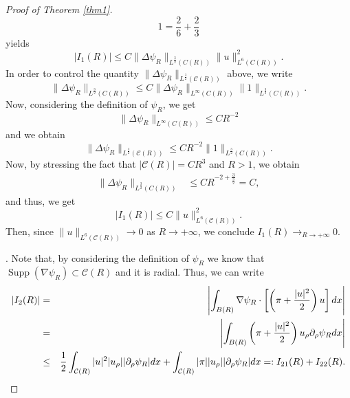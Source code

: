 \documentclass[a4paper,12pt]{amsart}
\theoremstyle{definition}
\theoremstyle{plain}
\def\vu{ u }
\def\vn{ \nabla }
\def\supp{\operatorname{Supp}}
\begin{document}
\begin{proof}[Proof of Theorem \ref{thm1}]
\begin{equation}\label{variable_exponents_1}
1=\frac{2}{6}+\frac{2}{3}
\end{equation} yields  
\begin{equation}\label{202618aveq32_T1}
|I_1(R)|\leq C
\|\Delta\psi_R\|_{L^{\frac 3 2}(C( R) )}
\|\vu\|_{L^{6}( C( R)  )}^2.
\end{equation}
 In order to control the quantity $\|\Delta \psi_R \|_{L^{  \frac 3 2 }(\mathcal{C}( R) )}$ above,
we write
\begin{equation}\label{EstimationNormeLinfiniTheta_R1}
\|\Delta \psi_R \|_{L^{ \frac 3 2 }(C( R) )}
\leq 
C\|\Delta \psi_R  \|_{L^{\infty}  (C (R) )
}\|1\|_{L^{\frac 3 2 }(C( R) )}.
\end{equation}
Now, considering  the definition of  $\psi_R$,  we get 
$$
\|\Delta \psi_R  \|_{L^{\infty}
( C(R) )
}\leq CR^{-2}$$
 and we obtain
$$\|\Delta \psi_R \|_{L^{ \frac 3 2 }
(\mathcal{C}(  R) )}\leq 
C R^{-2}\|1\|_{L^{ \frac 3 2 }(C(  R) )}
.$$
Now, by stressing the fact   that 
$|
\mathcal{C}( R) 
|=CR^3$ and $R>1$, we obtain
\begin{align}\label{EstimationC1}
\|\Delta \psi_R \|_{L^{\frac 3 2 }(C( R) )}&\leq
  C R^{-2+\frac 3{ \frac 3 2 }} =C
  ,
\end{align}
and thus, we get  
\begin{equation}\label{estimateI12}
|I_1(R)|\leq 
  C  
\|\vu\|_{L^{ 6 }( \mathcal{C}( R)  )}^2.
\end{equation}
Then, since $\|\vu\|_{L^{6}( \mathcal{C}( R)  )} \to 0$ as $R\to +\infty$, we conclude 
$
I_1(R) \to_{R\to +\infty} 0. 
$ 

 . Note that, by considering the definition of $\psi_R$ we know that $\supp( \vn \psi_R)\subset\mathcal{C}( R) $ {and it is radial}. Thus, we can write 
{
\color{black}
\begin{eqnarray}
\left|I_2(R)\right|&=&\left|\int_{B(R)} \vn \psi_R \cdot\left[\left(\pi+\frac{|\vu|^2}{2}\right) \vu\right]dx\right|\notag\\
&=& 
\left|\int_{B(R)} 
\left(\pi+\frac{|\vu|^2}{2}\right) 
\vu_\rho
 \partial_\rho\psi_R 
 dx\right|
\\
& \leq &\frac{1}{2}  
\int_{\mathcal{C}( R) }|\vu|^2
| \vu_\rho |
| \partial_\rho\psi_R |
 dx 
+
 \int_{\mathcal{C}( R) } 
 |\pi |
 | \vu_\rho |
| \partial_\rho\psi_R |  
  dx 
=: I_{21}(R)+I_{22}(R)
.%
\end{eqnarray}
}


\end{proof}
\end{document}
